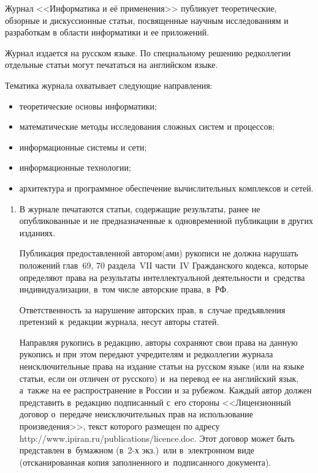 \vspace*{-60pt}
{ %

Журнал <<Информатика и её применения>>
публикует теоретические, обзорные и дискуссионные статьи,
посвященные научным исследованиям и разработкам в области
информатики и ее приложений.

Журнал издается на русском языке. По специальному решению
редколлегии отдельные статьи могут печататься на английском языке.

Тематика журнала охватывает следующие направления:
\begin{itemize}
\item теоретические основы информатики;\\[-15pt]
      \item
математические методы исследования сложных систем и процессов;\\[-15pt]
           \item
информационные системы и сети;\\[-15pt]
                \item
информационные технологии;\\[-15pt]
                     \item
архитектура и программное обеспечение вычислительных комплексов и сетей.\\[-15pt]
\end{itemize}


\noindent
\begin{enumerate}[1.]
\item В журнале печатаются статьи, содержащие результаты, ранее не опубликованные и
не предназначенные к одновременной публикации в других изданиях.

Публикация предоставленной автором(ами) рукописи не должна нарушать 
положений глав~69, 70 раздела~VII части~IV Гражданского кодекса, 
которые определяют права на результаты интеллектуальной деятельности 
и~средства индивидуализации, в~том числе авторские права, в~РФ.

Ответственность за нарушение авторских прав, в~случае предъявления претензий к~редакции журнала,  
несут авторы статей.



Направляя рукопись в редакцию, авторы сохраняют свои права на данную
рукопись и при этом передают учредителям и редколлегии журнала неисключительные права на
издание статьи на русском языке 
(или на языке статьи, если он отличен от рус\-ско\-го) и~на перевод ее на английский
язык, а~также на
ее распространение в России и за рубежом. 
Каждый автор должен представить в~редакцию подписанный 
с~его стороны <<Лицензионный договор о~передаче неисключительных прав 
на использование произведения>>, текст которого размещен по адресу 
{\sf http://www.ipiran.ru/publications/licence.doc}. 
Этот договор может быть пред\-став\-лен в~бумажном (в~2-х экз.)\ 
или в~электронном виде (отсканированная копия заполненного и~подписанного документа).





\end{enumerate}}
